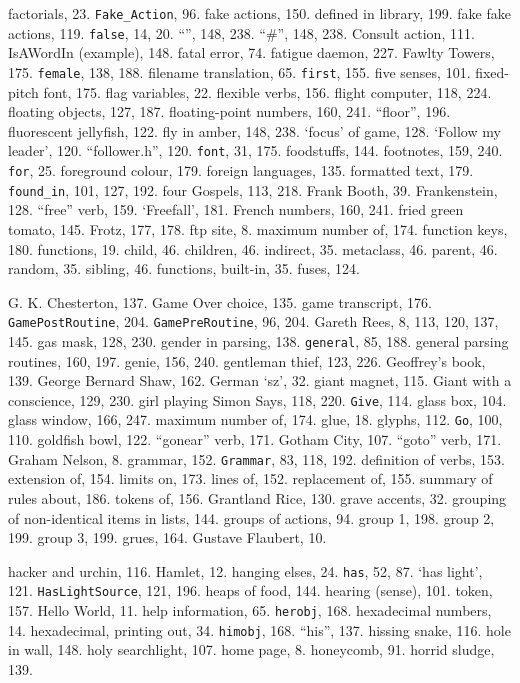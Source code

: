 factorials, 23.
{{\tt Fake\_Action}}, 96.
fake actions, 150.
\quad  defined in library, 199.
fake fake actions, 119.
{{\tt false}}, 14, 20.
``{\fam \ttfam \ninett *}'', 148, 238.
``{\fam \ttfam \ninett \#}'', 148, 238.
{\fam \ttfam \tentt Consult} action, 111.
{\fam \ttfam \tentt IsAWordIn} (example), 148.
fatal error, 74.
fatigue daemon, 227.
Fawlty Towers, 175.
{{\tt female}}, 138, 188.
filename translation, 65.
{{\tt first}}, 155.
five senses, 101.
fixed-pitch font, 175.
flag variables, 22.
flexible verbs, 156.
flight computer, 118, 224.
floating objects, 127, 187.
floating-point numbers, 160, 241.
``floor'', 196.
fluorescent jellyfish, 122.
fly in amber, 148, 238.
`focus' of game, 128.
`Follow my leader', 120.
``follower.h'', 120.
{{\tt font}}, 31, 175.
foodstuffs, 144.
footnotes, 159, 240.
{{\tt for}}, 25.
foreground colour, 179.
foreign languages, 135.
formatted text, 179.
{{\tt found\_in}}, 101, 127, 192.
four Gospels, 113, 218.
Frank Booth, 39.
Frankenstein, 128.
``free'' verb, 159.
`Freefall', 181.
French numbers, 160, 241.
fried green tomato, 145.
Frotz, 177, 178.
ftp site, 8.
\quad  maximum number of, 174.
function keys, 180.
functions, 19.
\quad  child, 46.
\quad  children, 46.
\quad  indirect, 35.
\quad  metaclass, 46.
\quad  parent, 46.
\quad  random, 35.
\quad  sibling, 46.
functions, built-in, 35.
fuses, 124.

G. K. Chesterton, 137.
Game Over choice, 135.
game transcript, 176.
{{\tt GamePostRoutine}}, 204.
{{\tt GamePreRoutine}}, 96, 204.
Gareth Rees, 8, 113, 120, 137, 145.
gas mask, 128, 230.
gender in parsing, 138.
{{\tt general}}, 85, 188.
general parsing routines, 160, 197.
genie, 156, 240.
gentleman thief, 123, 226.
Geoffrey's book, 139.
George Bernard Shaw, 162.
German `sz', 32.
giant magnet, 115.
Giant with a conscience, 129, 230.
girl playing Simon Says, 118, 220.
{{\tt Give}}, 114.
glass box, 104.
glass window, 166, 247.
\quad  maximum number of, 174.
glue, 18.
glyphs, 112.
{{\tt Go}}, 100, 110.
goldfish bowl, 122.
``gonear'' verb, 171.
Gotham City, 107.
``goto'' verb, 171.
Graham Nelson, 8.
grammar, 152.
{{\tt Grammar}}, 83, 118, 192.
\quad  definition of verbs, 153.
\quad  extension of, 154.
\quad  limits on, 173.
\quad  lines of, 152.
\quad  replacement of, 155.
\quad  summary of rules about, 186.
\quad  tokens of, 156.
Grantland Rice, 130.
grave accents, 32.
grouping of non-identical items in lists, 144.
groups of actions, 94.
\quad  group 1, 198.
\quad  group 2, 199.
\quad  group 3, 199.
grues, 164.
Gustave Flaubert, 10.

hacker and urchin, 116.
Hamlet, 12.
hanging elses, 24.
{{\tt has}}, 52, 87.
`has light', 121.
{{\tt HasLightSource}}, 121, 196.
heaps of food, 144.
hearing (sense), 101.
 token, 157.
Hello World, 11.
help information, 65.
{{\tt herobj}}, 168.
hexadecimal numbers, 14.
hexadecimal, printing out, 34.
{{\tt himobj}}, 168.
``his'', 137.
hissing snake, 116.
hole in wall, 148.
holy searchlight, 107.
home page, 8.
honeycomb, 91.
horrid sludge, 139.

